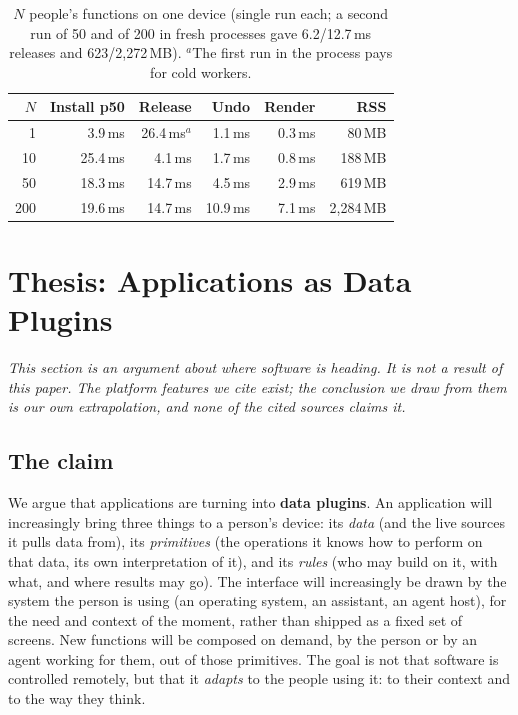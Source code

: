 \documentclass[10pt,twocolumn]{article}
\newcommand{\ms}{\,ms\xspace}
\begin{document}
\begin{table}[t]
\centering\footnotesize
\begin{tabular}{@{}rrrrrr@{}}
\toprule
$N$ & Install p50 & Release & Undo & Render & RSS \\
\midrule
1 & 3.9\ms & 26.4\ms$^{a}$ & 1.1\ms & 0.3\ms & 80\,MB \\
10 & 25.4\ms & 4.1\ms & 1.7\ms & 0.8\ms & 188\,MB \\
50 & 18.3\ms & 14.7\ms & 4.5\ms & 2.9\ms & 619\,MB \\
200 & 19.6\ms & 14.7\ms & 10.9\ms & 7.1\ms & 2{,}284\,MB \\
\bottomrule
\end{tabular}
\caption{$N$ people's functions on one device (single run each; a second run of 50 and of 200 in
fresh processes gave 6.2/12.7\ms releases and 623/2{,}272\,MB). $^{a}$The first run in the process
pays for cold workers.}
\label{tab:scale}
\end{table}

\section{Thesis: Applications as Data Plugins}
\label{sec:thesis}

\emph{This section is an argument about where software is heading. It is not a result of this paper.
The platform features we cite exist; the conclusion we draw from them is our own extrapolation, and
none of the cited sources claims it.}

\subsection{The claim}

We argue that applications are turning into \textbf{data plugins}. An application will increasingly
bring three things to a person's device: its \emph{data} (and the live sources it pulls data from),
its \emph{primitives} (the operations it knows how to perform on that data, its own interpretation
of it), and its \emph{rules} (who may build on it, with what, and where results may go). The
interface will increasingly be drawn by the system the person is using (an operating system, an
assistant, an agent host), for the need and context of the moment, rather than shipped as a fixed
set of screens. New functions will be composed on demand, by the person or by an agent working for
them, out of those primitives. The goal is not that software is controlled remotely, but that it
\emph{adapts} to the people using it: to their context and to the way they think.
\end{document}
